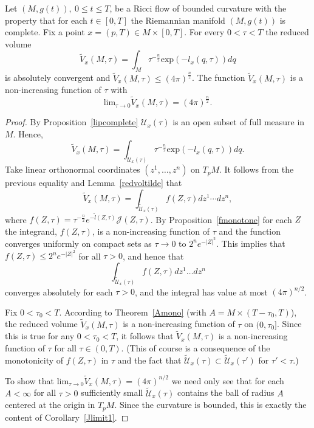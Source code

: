 \begin{theorem}
\label{thm:reduced-volume-monotone-bound}
\label{4pi} Let $(M,g(t)),\ 0\le t\le T$, be a Ricci flow
of bounded curvature with the property that for each $t\in [0,T]$
the Riemannian manifold $(M,g(t))$ is complete. Fix a point
$x=(p,T)\in M\times [0,T]$. For every $0<\tau<T$ the reduced volume
$$\widetilde V_x(M,\tau)=\int_{M} \tau^{-\frac{n}{2}}\mathrm{exp}(-l_x(q,\tau))dq$$
is absolutely convergent and  $\widetilde V_x(M,\tau)\le
(4\pi)^{\frac{n}{2}}$. The function $\widetilde V_x(M,\tau)$ is a
non-increasing function of $\tau$ with
$$\mathrm{lim}_{\tau\rightarrow 0}\widetilde V_x(M,\tau)=(4\pi)^{\frac{n}{2}}.$$
\end{theorem}

\begin{proof}\sketch
{}
By Proposition~\ref{lipcomplete} ${\mathcal U}_x(\tau)$ is an open
subset of full measure in $M$. Hence, $$\widetilde
V_x(M,\tau)=\int_{{\mathcal U}_x(\tau)}\tau^{-\frac{n}{2}}\mathrm{exp}(-l_x(q,\tau))dq.$$
 Take
linear orthonormal coordinates $(z^1,\ldots,z^n)$ on $T_pM$. It
follows from  the previous equality and Lemma~\ref{redvoltilde} that
$$\widetilde V_x(M,\tau)=\int_{\widetilde {\mathcal U}_{x}(\tau)}f(Z,\tau)dz^1\cdots dz^n,$$
where $f(Z,\tau)=\tau^{-\frac{n}{2}}e^{-\widetilde
l(Z,\tau)}{\mathcal J}(Z,\tau)$. By Proposition~\ref{fmonotone} for
each $Z$ the integrand, $f(Z,\tau)$, is a non-increasing function of
$\tau$ and the function converges uniformly on compact sets as
$\tau\rightarrow 0$ to $2^ne^{-|Z|^2}$. This implies that
$f(Z,\tau)\le 2^ne^{-|Z|^2}$ for all $\tau>0$, and hence that
$$\int_{\widetilde{\mathcal U}_x(\tau)}f(Z,\tau)dz^1\ldots dz^n$$
converges absolutely for each $\tau>0$, and the integral has value
at most $(4\pi)^{n/2}$.

Fix $0<\tau_0<T$. According to Theorem~\ref{Amono} (with $A=M\times
(T-\tau_0,T)$), the reduced volume $\widetilde V_x(M,\tau)$ is a
non-increasing function of $\tau$ on $(0,\tau_0]$. Since this is
true for any $0<\tau_0<T$, it follows that $\widetilde V_x(M,\tau)$
is a non-increasing function of $\tau$ for all $\tau\in (0,T)$.
 (This of course is a consequence of the
monotonicity of $f(Z,\tau)$ in $\tau$ and the fact that $\widetilde {\mathcal
U}_x(\tau)\subset \widetilde {\mathcal U}_x(\tau')$ for $\tau'<\tau$.)



To show that $\mathrm{lim}_{\tau\rightarrow 0}\widetilde
 V_x(M,\tau)= (4\pi)^{n/2}$ we need only see that for
  each $A<\infty$ for all $\tau>0$ sufficiently small
 $\widetilde {\mathcal U}_x(\tau)$ contains the ball of radius $A$ centered at the origin
 in $T_pM$. Since the  curvature is bounded, this is exactly
 the content of Corollary~\ref{Jlimit1}.
\end{proof}



